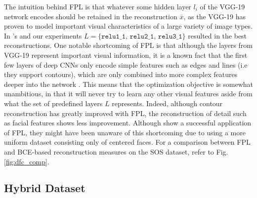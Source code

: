 \documentclass[twocolumn]{article}
\begin{document}
\noindent The intuition behind FPL is that whatever some hidden layer \(l_i\) of
the VGG-19 network encodes should be retained in the reconstruction
\(\bar{x}\), as the VGG-19 has proven to model important visual
characteristics of a large variety of image types. In
\citet{hou2017deep}'s and our experiments
\(L = \{\texttt{relu1\_1, relu2\_1, relu3\_1\}}\) resulted in the best
reconstructions. One notable shortcoming of FPL is that although the
layers from VGG-19 represent important visual information, it is a known
fact that the first few layers of deep CNNs only encode simple features
such as edges and lines (i.e they support contours), which are only
combined into more complex features deeper into the network
\citetext{\citealp{liu2017towards}; \citealp[FPL's authors][ note
something similar]{hou2017deep}}. This means that the optimization
objective is somewhat unambitious, in that it will never try to learn
any other visual features \citep[for examples, refer to][Fig.
6.]{liu2017towards} aside from what the set of predefined layers \(L\)
represents. Indeed, although contour reconstruction has greatly improved
with FPL, the reconstruction of detail such as facial features shows
less improvement. Although \citet{hou2017deep} show a successful
application of FPL, they might have been unaware of this shortcoming due
to using a more uniform dataset consisting only of centered faces. For a
comparison between FPL and BCE-based reconstruction measures on the SOS
dataset, refer to Fig. \ref{fig:dfc_comp}.


\hypertarget{hybrid}{%
\subsection{Hybrid Dataset}\label{hybrid}}
\end{document}
